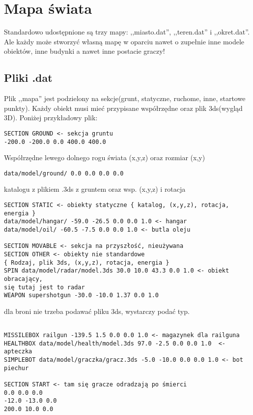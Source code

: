 \documentclass[licencjacka]{pracamgr}
\begin{document}
\section {Mapa świata}

Standardowo udostępnione są trzy mapy: ,,miasto.dat'', ,,teren.dat'' i ,,okret.dat''. Ale każdy może
stworzyć własną mapę w oparciu nawet o zupełnie inne modele obiektów, inne budynki a nawet inne postacie graczy!

\subsection {Pliki .dat}

Plik ,,mapa'' jest podzielony na sekcje(grunt, statyczne, ruchome, inne, startowe punkty).
Każdy obiekt musi mieć przypisane współrzędne oraz plik 3ds(wygląd 3D). Poniżej
przykładowy plik:

\begin{verbatim}
SECTION GROUND <- sekcja gruntu
-200.0 -200.0 0.0 400.0 400.0
\end{verbatim}
Współrzędne lewego dolnego rogu świata (x,y,z) oraz
rozmiar (x,y)

\begin{verbatim}
data/model/ground/ 0.0 0.0 0.0 0.0
\end{verbatim}
katalogu z plikiem .3ds z gruntem oraz wsp. (x,y,z) i rotacja

\begin{verbatim}
SECTION STATIC <- obiekty statyczne { katalog, (x,y,z), rotacja,
energia }
data/model/hangar/ -59.0 -26.5 0.0 0.0 1.0 <- hangar
data/model/oil/ -60.5 -7.5 0.0 0.0 1.0 <- butla oleju

SECTION MOVABLE <- sekcja na przyszłość, nieużywana
SECTION OTHER <- obiekty nie standardowe
{ Rodzaj, plik 3ds, (x,y,z), rotacja, energia }
SPIN data/model/radar/model.3ds 30.0 10.0 43.3 0.0 1.0 <- obiekt obracający,
się tutaj jest to radar
WEAPON supershotgun -30.0 -10.0 1.37 0.0 1.0
\end{verbatim}
dla broni nie trzeba podawać pliku 3ds, wystarczy podać typ.
\begin{verbatim}

MISSILEBOX railgun -139.5 1.5 0.0 0.0 1.0 <- magazynek dla railguna
HEALTHBOX data/model/health/model.3ds 97.0 -2.5 0.0 0.0 1.0  <- apteczka
SIMPLEBOT data/model/graczka/gracz.3ds -5.0 -10.0 0.0 0.0 1.0 <- bot piechur

SECTION START <- tam się gracze odradzają po śmierci
0.0 0.0 0.0
-12.0 -13.0 0.0
200.0 10.0 0.0
\end{verbatim}
\end{document}

